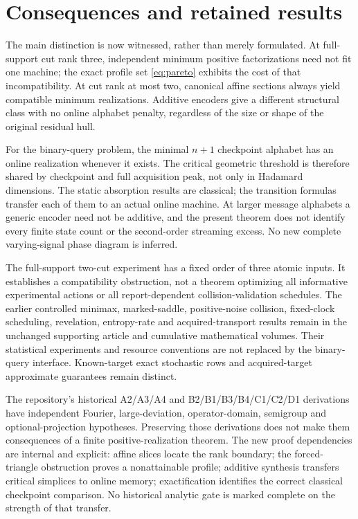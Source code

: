 \section{Consequences and retained results}
The main distinction is now witnessed, rather than merely formulated.
At full-support cut rank three, independent minimum positive
factorizations need not fit one machine; the exact profile set
\eqref{eq:pareto} exhibits the cost of that incompatibility. At cut
rank at most two, canonical affine sections always yield compatible
minimum realizations. Additive encoders give a different structural
class with no online alphabet penalty, regardless of the size or shape
of the original residual hull.

For the binary-query problem, the minimal $n+1$ checkpoint alphabet
has an online realization whenever it exists. The critical geometric
threshold is therefore shared by checkpoint and full acquisition peak,
not only in Hadamard dimensions. The static absorption results are
classical; the transition formulas transfer each of them to an actual
online machine. At larger message alphabets a generic encoder need not
be additive, and the present theorem does not identify every finite
state count or the second-order streaming excess. No new complete
varying-signal phase diagram is inferred.

The full-support two-cut experiment has a fixed order of three atomic
inputs. It establishes a compatibility obstruction, not a theorem
optimizing all informative experimental actions or all report-dependent
collision-validation schedules. The earlier controlled minimax,
marked-saddle, positive-noise collision, fixed-clock scheduling,
revelation, entropy-rate and acquired-transport results remain in the
unchanged supporting article and cumulative mathematical volumes. Their
statistical experiments and resource conventions are not replaced by
the binary-query interface. Known-target exact stochastic rows and
acquired-target approximate guarantees remain distinct.

The repository's historical A2/A3/A4 and B2/B1/B3/B4/C1/C2/D1 derivations
have independent Fourier, large-deviation, operator-domain, semigroup
and optional-projection hypotheses. Preserving those derivations does
not make them consequences of a finite positive-realization theorem.
The new proof dependencies are internal and explicit: affine slices
locate the rank boundary; the forced-triangle obstruction proves a
nonattainable profile; additive synthesis transfers critical simplices
to online memory; exactification identifies the correct classical
checkpoint comparison. No historical analytic gate is marked complete
on the strength of that transfer.

